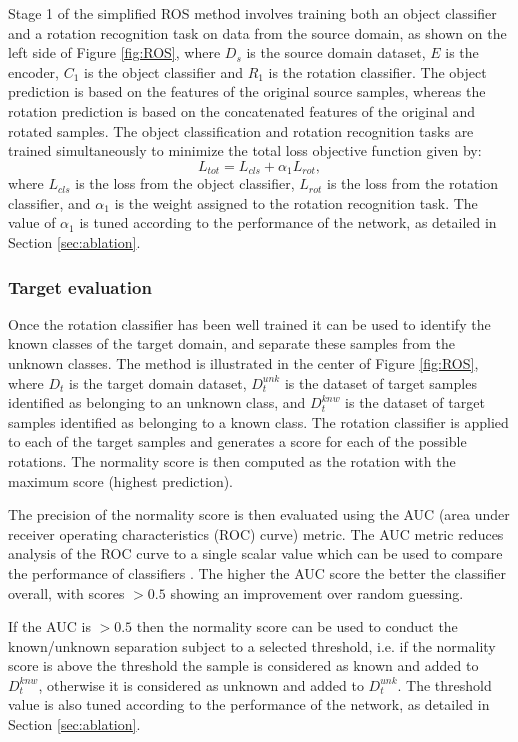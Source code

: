 \documentclass[10pt,twocolumn,letterpaper]{article}
\begin{document}
Stage 1 of the simplified ROS method involves training both an object classifier and a rotation recognition task on data from the source domain, as shown on the left side of Figure \ref{fig:ROS}, where $D_s$ is the source domain dataset, $E$ is the encoder, $C_1$ is the object classifier and $R_1$ is the rotation classifier. The object prediction is based on the features of the original source samples, whereas the rotation prediction is based on the concatenated features of the original and rotated samples. The object classification and rotation recognition tasks are trained simultaneously to minimize the total loss objective function given by:
\begin{equation}
  L_{tot} = L_{cls} + \alpha_1 L_{rot} ,
  \label{eq:totalloss}
\end{equation}
where $L_{cls}$ is the loss from the object classifier, $L_{rot}$ is the loss from the rotation classifier, and $\alpha_1$ is the weight assigned to the rotation recognition task. The value of $\alpha_1$ is tuned according to the performance of the network, as detailed in Section \ref{sec:ablation}.


\subsubsection*{Target evaluation}

Once the rotation classifier has been well trained it can be used to identify the known classes of the target domain, and separate these samples from the unknown classes. The method is illustrated in the center of Figure \ref{fig:ROS}, where $D_t$ is the target domain dataset, $D_t^{unk}$ is the dataset of target samples identified as belonging to an unknown class, and $D^{knw}_t$ is the dataset of target samples identified as belonging to a known class. The rotation classifier is applied to each of the target samples and generates a score for each of the possible rotations. The normality score is then computed as the rotation with the maximum score (highest prediction).

The precision of the normality score is then evaluated using the AUC (area under receiver operating characteristics (ROC) curve) metric. The AUC metric reduces analysis of the ROC curve to a single scalar value which can be used to compare the performance of classifiers \cite{Fawcett2006}. The higher the AUC score the better the classifier overall, with scores $> 0.5$ showing an improvement over random guessing.

If the AUC is $> 0.5$ then the normality score can be used to conduct the known/unknown separation subject to a selected threshold, i.e. if the normality score is above the threshold the sample is considered as known and added to $D^{knw}_t$, otherwise it is considered as unknown and added to $D_t^{unk}$. The threshold value is also tuned according to the performance of the network, as detailed in Section \ref{sec:ablation}.
\end{document}
